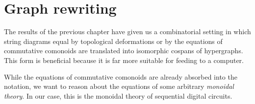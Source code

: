 \chapter{Graph rewriting}

The results of the previous chapter have given us a combinatorial setting in
which string diagrams equal by topological deformations or by the equations of
commutative comonoids are translated into isomorphic cospans of hypergraphs.
This form is beneficial because it is far more suitable for feeding to a
computer.

While the equations of commutative comonoids are already absorbed into the
notation, we want to reason about the equations of some arbitrary
\emph{monoidal theory}.
In our case, this is the monoidal theory of sequential digital circuits.



